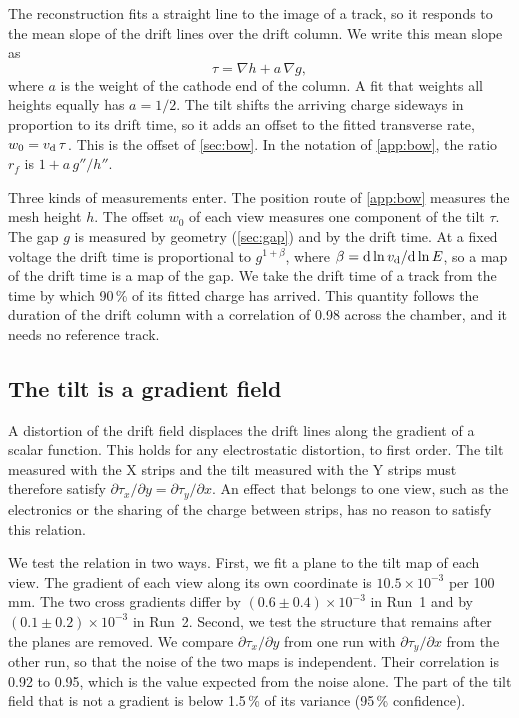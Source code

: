 The reconstruction fits a straight line to the image of a track, so it responds to the mean slope of the drift lines
over the drift column. We write this mean slope as
\begin{equation}
  \tau=\nabla h+a\,\nabla g,
  \label{eq:tilt}
\end{equation}
where $a$ is the weight of the cathode end of the column. A fit that weights all heights equally has $a=1/2$. The tilt
shifts the arriving charge sideways in proportion to its drift time, so it adds an offset to the fitted transverse
rate, $w_0=v_\mathrm{d}\,\tau$. This is the offset of \cref{sec:bow}. In the notation of \cref{app:bow}, the ratio $r_f$ is
$1+a\,g''/h''$.

Three kinds of measurements enter. The position route of \cref{app:bow} measures the mesh height $h$. The offset $w_0$
of each view measures one component of the tilt $\tau$. The gap $g$ is measured by geometry (\cref{sec:gap}) and by the
drift time. At a fixed voltage the drift time is proportional to $g^{1+\beta}$, where
$\beta=\mathrm{d}\ln v_\mathrm{d}/\mathrm{d}\ln E$, so a map of the drift time is a map of the gap. We take the drift time of a
track from the time by which 90\,\% of its fitted charge has arrived. This quantity follows the duration of the drift
column with a correlation of 0.98 across the chamber, and it needs no reference track.

\subsection{The tilt is a gradient field}
A distortion of the drift field displaces the drift lines along the gradient of a scalar function. This holds for any
electrostatic distortion, to first order. The tilt measured with the X strips and the tilt measured with the Y strips
must therefore satisfy $\partial\tau_x/\partial y=\partial\tau_y/\partial x$. An effect that belongs to one view, such as
the electronics or the sharing of the charge between strips, has no reason to satisfy this relation.

We test the relation in two ways. First, we fit a plane to the tilt map of each view. The gradient of each view along
its own coordinate is $10.5\times10^{-3}$ per 100\,mm. The two cross gradients differ by $(0.6\pm0.4)\times10^{-3}$ in
Run~1 and by $(0.1\pm0.2)\times10^{-3}$ in Run~2. Second, we test the structure that remains after the planes are
removed. We compare $\partial\tau_x/\partial y$ from one run with $\partial\tau_y/\partial x$ from the other run, so
that the noise of the two maps is independent. Their correlation is 0.92 to 0.95, which is the value expected from the
noise alone. The part of the tilt field that is not a gradient is below 1.5\,\% of its variance (95\,\% confidence).

